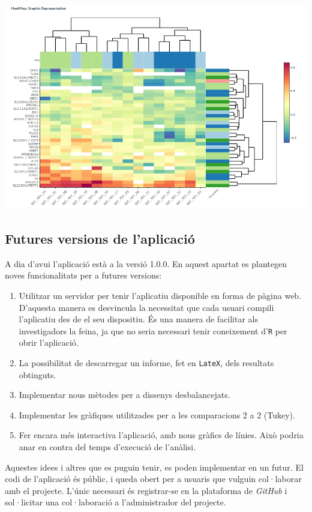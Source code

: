 \documentclass[english]{article}
\begin{document}
\begin{center}
\includegraphics[scale=0.6]{app6.png}
\end{center}
\clearpage
\twocolumn
\subsection{Futures versions de l'aplicació}

A dia d'avui l'aplicació està a la versió 1.0.0. En aquest apartat es plantegen noves funcionalitats per a futures versions:
\begin{enumerate}
\item Utilitzar un servidor per tenir l'aplicatiu disponible en forma de pàgina web. D'aquesta manera es desvincula la necessitat que cada usuari compili l'aplicatiu des de el seu dispositiu. És una manera de facilitar als investigadors la feina, ja que no seria necessari tenir coneixement d'\texttt{R} per obrir l'aplicació.
\item La possibilitat de descarregar un informe, fet en \texttt{LateX}, dels resultats obtinguts.
\item Implementar nous mètodes per a dissenys desbalancejats.
\item Implementar les gràfiques utilitzades per a les comparacions 2 a 2 (Tukey).
\item Fer encara més interactiva l'aplicació, amb nous gràfics de línies. Això podria anar en contra del temps d'execució de l'anàlisi.
\end{enumerate}
Aquestes idees i altres que es puguin tenir, es poden implementar en un futur. El codi de l'aplicació és públic, i queda obert per a usuaris que vulguin col·laborar amb el projecte. L'únic necessari és registrar-se en la plataforma de \textit{GitHub} i sol·licitar una col·laboració a l'administrador del projecte.
\newpage
\end{document}
